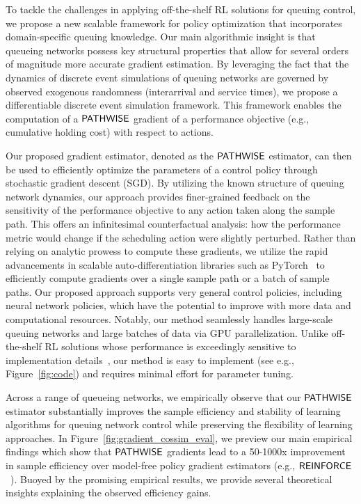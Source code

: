 To tackle the challenges in applying off-the-shelf RL solutions for queuing control, we propose a new scalable framework for policy optimization that incorporates domain-specific queuing knowledge. Our main algorithmic insight is that queueing networks possess key structural properties that allow for several orders of magnitude more accurate gradient estimation. 
By leveraging the fact that the dynamics of discrete event simulations of queuing networks are governed by observed exogenous randomness (interarrival and service times), we propose a differentiable discrete event simulation framework. This framework enables the computation of a $\mathsf{PATHWISE}$ gradient of a performance objective (e.g., cumulative holding cost) with respect to actions. 

Our proposed gradient estimator, denoted as the $\mathsf{PATHWISE}$ estimator, can then be used to efficiently optimize the parameters of a control policy through stochastic gradient descent (SGD). By utilizing the known structure of queuing network dynamics, our approach provides finer-grained feedback on the sensitivity of the performance objective to any action taken along the sample path. This offers an infinitesimal counterfactual analysis: how the performance metric would change if the scheduling action were slightly perturbed.  
Rather than relying on analytic prowess to compute these gradients, we utilize the rapid advancements in scalable auto-differentiation libraries such as PyTorch~\citep{PaszkeGrChChYaDeLiDeAnLe17} to efficiently compute gradients over a single sample path or a batch of sample paths. 
Our proposed approach supports very general control policies, including neural network policies, which have the potential to improve with more data and computational resources. 
Notably, our method seamlessly handles large-scale queuing networks and large batches of data via GPU parallelization. Unlike off-the-shelf RL solutions whose performance is exceedingly sensitive to implementation details~\cite{huang2022implementation, ilyas2018closer}, our method is easy to implement (see e.g., Figure~\ref{fig:code}) and requires minimal effort for parameter tuning.

Across a range of queueing networks, we empirically observe that our $\mathsf{PATHWISE}$ estimator substantially improves the sample efficiency and stability of learning algorithms for queuing network control while preserving the flexibility of learning approaches.  In Figure~\ref{fig:gradient_cossim_eval}, we preview our main empirical findings which show that $\mathsf{PATHWISE}$ gradients lead to a 50-1000x improvement in sample efficiency over model-free policy gradient estimators (e.g., $\mathsf{REINFORCE}$~\cite{williams1992simple}). 
Buoyed by the promising empirical results, we
provide several theoretical insights explaining the observed efficiency gains. 


